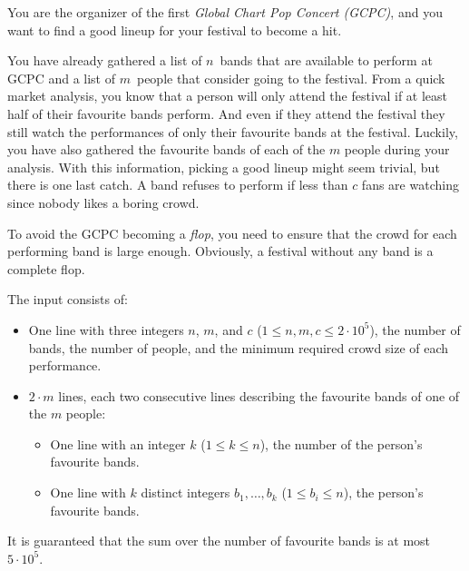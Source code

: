 
\newcommand{\maxn}{2\cdot10^5}
\newcommand{\maxsumk}{5\cdot10^5}


You are the organizer of the first \emph{Global Chart Pop Concert (GCPC)}, and you want to find a good lineup for your festival to become a hit. 

You have already gathered a list of $n$~bands that are available to perform at GCPC and a list of $m$~people that consider going to the festival.
From a quick market analysis, you know that a person will only attend the festival if at least half of their favourite bands perform.
And even if they attend the festival they still watch the performances of only their favourite bands at the festival.
Luckily, you have also gathered the favourite bands of each of the $m$ people during your analysis.
With this information, picking a good lineup might seem trivial, but there is one last catch.
A band refuses to perform if less than $c$ fans are watching since nobody likes a boring crowd.

To avoid the GCPC becoming a \emph{flop}, you need to ensure that the crowd for each performing band is large enough.
Obviously, a festival without any band is a complete flop.

\begin{Input}
	The input consists of:
	\begin{itemize}
		\item One line with three integers $n$, $m$, and $c$ ($1 \leq n, m, c \leq \maxn$), the number of bands, the number of people, and the minimum required crowd size of each performance.
        \item $2 \cdot m$ lines, each two consecutive lines describing the favourite bands of one of the $m$ people: 
            \begin{itemize}
                \item One line with an integer $k$ ($1 \leq k \leq n$), the number of the person's favourite bands.
                \item One line with $k$ distinct integers $b_1, \dots, b_k$ ($1 \leq b_i \leq n$), the person's favourite bands.
            \end{itemize}
	\end{itemize}
	It is guaranteed that the sum over the number of favourite bands is at most $\maxsumk$.
\end{Input}

